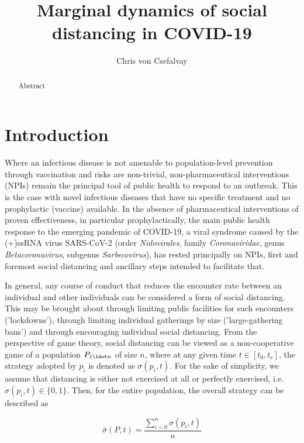 \documentclass{article}
\title{Marginal dynamics of social distancing in COVID-19}
\author{Chris von Csefalvay}
\begin{document}
\maketitle

\begin{abstract}
    Abstract
\end{abstract}

\section{Introduction} %
\label{sec:introduction}
Where an infectious disease is not amenable to population-level prevention through vaccination and risks are non-trivial, non-pharmaceutical interventions (NPIs) remain the principal tool of public health to respond to an outbreak. This is the case with novel infectious diseases that have no specific treatment and no prophylactic (vaccine) available. In the absence of pharmaceutical interventions of proven effectiveness, in particular prophylactically, the main public health response to the emerging pandemic of COVID-19, a viral syndrome caused by the (+)ssRNA virus SARS-CoV-2 (order \emph{Nidovirales}, family \emph{Coronaviridae}, genus \emph{Betacoronavirus}, subgenus \emph{Sarbecovirus}), has rested principally on NPIs, first and foremost social distancing and ancillary steps intended to facilitate that.

In general, any course of conduct that reduces the encounter rate between an individual and other individuals can be considered a form of social distancing. This may be brought about through limiting public facilities for such encounters ('lockdowns'), through limiting individual gatherings by size ('large-gathering bans') and through encouraging individual social distancing. From the perspective of game theory, social distancing can be viewed as a non-cooperative game of a population $P_{1 \ldot n}$ of size $n$, where at any given time $t \in [t_0, t_{e}]$, the strategy adopted by $p_i$ is denoted as $\sigma (p_i, t)$. For the sake of simplicity, we assume that distancing is either not exercised at all or perfectly exercised, i.e. $\sigma (p_i, t) \in \{ 0, 1 \}$. Then, for the entire population, the overall strategy can be described as 

\begin{equation}
	\bar{\sigma}(P, t) = \frac{\displaystyle \sum_{i = 0}^n \sigma(p_i, t)}{n}
	\label{eq:overall_strategy}
\end{equation}
\end{document}
